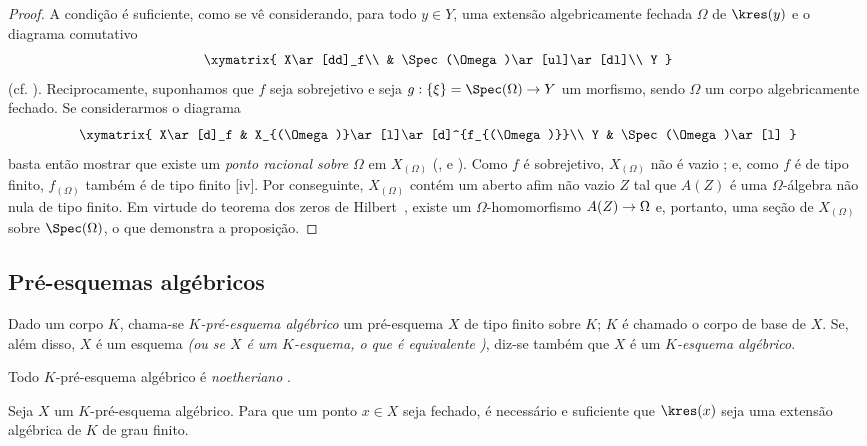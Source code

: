 \documentclass[oneside]{amsart}
\makeatletter
\newcommand{\ega@arrow}[2]{\mathchoice{#1}{#2}{#2}{#2}}
\renewcommand{\to}{\ega@arrow{\longrightarrow}{\rightarrow}}
\let\EGAOriginalLabel\label
\renewcommand{\label}[1]{\phantomsection\EGAOriginalLabel{#1}}
\makeatother
\begin{document}
\begin{proof}
A condição é suficiente, como se vê considerando, para todo $y\in Y$, uma
extensão algebricamente fechada $\Omega$ de $\kres(y)$ e o diagrama comutativo
\[
  \xymatrix{
    X\ar[dd]_f\\
    & \Spec(\Omega)\ar[ul]\ar[dl]\\
    Y
  }
\]
(cf. ).
Reciprocamente, suponhamos que $f$ seja sobrejetivo e seja
$g:\{\xi\}=\Spec(\Omega)\to Y$ um morfismo, sendo $\Omega$ um corpo
algebricamente fechado.
Se considerarmos o diagrama
\[
  \xymatrix{
    X\ar[d]_f &
    X_{(\Omega)}\ar[l]\ar[d]^{f_{(\Omega)}}\\
    Y &
    \Spec(\Omega)\ar[l]
  }
\]
basta então mostrar que existe um \emph{ponto racional sobre $\Omega$} em
$X_{(\Omega)}$ (,  e
).
Como $f$ é sobrejetivo, $X_{(\Omega)}$ não é vazio ; e, como
$f$ é de tipo finito, $f_{(\Omega)}$ também é de tipo finito
[iv].
Por conseguinte, $X_{(\Omega)}$ contém um aberto afim não vazio $Z$ tal que
$A(Z)$ é uma $\Omega$-álgebra não nula de tipo finito.
Em virtude do teorema dos zeros de Hilbert~\cite{I-21}, existe um
$\Omega$-homomorfismo $A(Z)\to\Omega$ e, portanto, uma seção de
$X_{(\Omega)}$ sobre $\Spec(\Omega)$, o que demonstra a proposição.
\end{proof}

\subsection{Pré-esquemas algébricos}
\label{subsection:I.6.4}
\label{I.6.4}

\begin{definition}[6.4.1]
\label{I.6.4.1}
Dado um corpo $K$, chama-se \emph{$K$-pré-esquema algébrico} um pré-esquema
$X$ de tipo finito sobre $K$; $K$ é chamado o corpo de base de $X$.
Se, além disso, $X$ é um esquema \emph{(ou se $X$ é um
\emph{$K$-esquema}, o que é equivalente )}, diz-se também que
$X$ é um \emph{$K$-esquema algébrico}.
\end{definition}

Todo $K$-pré-esquema algébrico é \emph{noetheriano} .

\begin{proposition}[6.4.2]
\label{I.6.4.2}
Seja $X$ um $K$-pré-esquema algébrico.
Para que um ponto $x\in X$ seja fechado, é necessário e suficiente que
$\kres(x)$ seja uma extensão algébrica de $K$ de grau finito.
\end{proposition}
\end{document}
